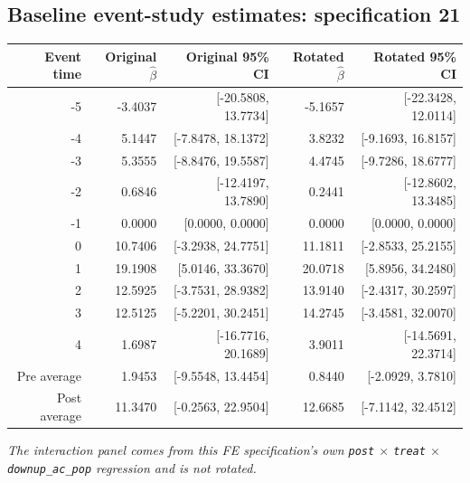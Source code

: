 \documentclass[10pt]{article}
\begin{document}
\subsection*{Baseline event-study estimates: specification 21}
\begin{center}
\scriptsize
\begin{tabular}{r rr rr}
\toprule
Event time & Original $\hat\beta$ & Original 95\% CI & Rotated $\hat\beta$ & Rotated 95\% CI \\
\midrule
-5 & -3.4037 & [-20.5808, 13.7734] & -5.1657 & [-22.3428, 12.0114] \\
-4 & 5.1447 & [-7.8478, 18.1372] & 3.8232 & [-9.1693, 16.8157] \\
-3 & 5.3555 & [-8.8476, 19.5587] & 4.4745 & [-9.7286, 18.6777] \\
-2 & 0.6846 & [-12.4197, 13.7890] & 0.2441 & [-12.8602, 13.3485] \\
-1 & 0.0000 & [0.0000, 0.0000] & 0.0000 & [0.0000, 0.0000] \\
0 & 10.7406 & [-3.2938, 24.7751] & 11.1811 & [-2.8533, 25.2155] \\
1 & 19.1908 & [5.0146, 33.3670] & 20.0718 & [5.8956, 34.2480] \\
2 & 12.5925 & [-3.7531, 28.9382] & 13.9140 & [-2.4317, 30.2597] \\
3 & 12.5125 & [-5.2201, 30.2451] & 14.2745 & [-3.4581, 32.0070] \\
4 & 1.6987 & [-16.7716, 20.1689] & 3.9011 & [-14.5691, 22.3714] \\
\midrule
Pre average & 1.9453 & [-9.5548, 13.4454] & 0.8440 & [-2.0929, 3.7810] \\
Post average & 11.3470 & [-0.2563, 22.9504] & 12.6685 & [-7.1142, 32.4512] \\
\bottomrule
\end{tabular}
\end{center}
\medskip
\textit{The interaction panel comes from this FE specification's own \texttt{post} $\times$ \texttt{treat} $\times$ \texttt{downup\_ac\_pop} regression and is not rotated.}
\clearpage
\end{document}
